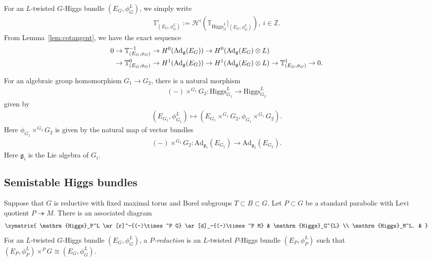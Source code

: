 \documentclass [11pt,oneside,a4paper,mathscr]{amsart}
\theoremstyle{definition}
\newcommand{\fg}{\mathfrak{g}}
\newcommand{\Hig}{\mathrm{Higgs}}
\begin{document}
For an $L$-twisted $G$-Higgs bundle $(E_G, \phi_G^{L})$, we simply write 
\begin{align}\label{def:Ti}
    \mathbb{T}_{(E_G, \phi_G^{L})}^i :=\mathcal{H}^i(\mathbb{T}_{\Hig_G^{L}}|_{(E_G, \phi_G^{L})}), \ i\in \mathbb{Z}.
\end{align}
From Lemma~\ref{lem:cotangent}, we have the exact sequence
\begin{align}\label{exact}
    0&\to \mathbb{T}_{(E_G, \phi_G)}^{-1} \to H^0(\mathrm{Ad}_{\mathfrak{g}}(E_G))
    \to H^0(\mathrm{Ad}_{\mathfrak{g}}(E_G)\otimes L)  \\
 \notag   &\to \mathbb{T}_{(E_G, \phi_G)}^{0}\to H^1(\mathrm{Ad}_{\mathfrak{g}}(E_G))\to H^1(\mathrm{Ad}_{\mathfrak{g}}(E_G)\otimes L)
    \to \mathbb{T}_{(E_G, \phi_G)}^{1}\to 0.
\end{align}

For an algebraic group homomorphism $G_1 \to G_2$, there is a natural 
morphism 
\begin{align*}
    (-)\times^{G_1}G_2 \colon \Hig_{G_1}^L\to \Hig_{G_2}^L
    \end{align*}
    given by 
    \begin{align*}
    (E_{G_1}, \phi_{G_1}^L) \mapsto (E_{G_1}\times^{G_1}G_2, \phi_{G_1}\times^{G_1}G_2).
\end{align*}
Here $\phi_{G_1}\times^{G_2}G_2$
is given by the natural map of vector bundles
\begin{align*}
    (-)\times^{G_1} G_2 \colon \mathrm{Ad}_{\mathfrak{g}_1}(E_{G_1}) \to \mathrm{Ad}_{\mathfrak{g}_2}(E_{G_2}).
\end{align*}
Here $\fg_i$ is the Lie algebra of $G_i$. 


\subsection{Semistable Higgs bundles}\label{subsec:ssH}
Suppose that $G$ is reductive with fixed maximal torus and Borel subgroups $T\subset B\subset G$. Let $P\subset G$ be a standard parabolic with Levi quotient $P\twoheadrightarrow M$. 
There is an associated diagram 
\begin{align*}
    \xymatrix{
\Hig_P^L \ar[r]^-{(-)\times^P G} \ar[d]_-{(-)\times^P M} & \Hig_G^{L} \\
\Hig_M^L.  &
}
\end{align*}
For an $L$-twisted $G$-Higgs bundle $(E_G, \phi_G^{L})$, a \textit{$P$-reduction} is an $L$-twisted $P$-Higgs bundle 
$(E_P, \phi_P^L)$ such that $(E_P, \phi_P^L)\times^P G \cong(E_G, \phi_G^{L})$. 
\end{document}
